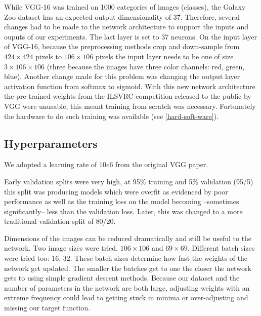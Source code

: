 
While VGG-16 was trained on 1000 categories of images (classes), the Galaxy Zoo dataset has an expected output dimensionality of 37. Therefore, several changes had to be made to the network architecture to support the inputs and ouputs of our experiments. The last layer is set to 37 neurons. On the input layer of VGG-16, because the preprocessing methods crop and down-sample from $424 \times 424$ pixels to $106 \times 106$ pixels the input layer needs to be one of size $3 \times 106 \times 106$ (three because the images have three color channels: red, green, blue). Another change made for this problem was changing the output layer activation function from softmax to sigmoid. With this new network architecture the pre-trained weights from the ILSVRC competition released to the public by VGG were unusable, this meant training from scratch was necessary. Fortunately the hardware to do such training was available (see \ref{hard-soft-ware}).

\subsection{Hyperparameters}

We adopted a learning rate of $10e6$ from the original VGG paper.

Early validation splits were very high, at 95\% training and 5\% validation (95/5) this split was producing models which were overfit as evidenced by poor performance as well as the training loss on the model becoming --sometimes significantly-- less than the validation loss. Later, this was changed to a more traditional validation split of 80/20.

Dimensions of the images can be reduced dramatically and still be useful to the network. Two image sizes were tried, $106 \times 106$ and $69 \times 69$. Different batch sizes were tried too: 16, 32. These batch sizes determine how fast the weights of the network get updated. The smaller the batches get to one the closer the network gets to using simple gradient descent methods. Because our dataset and the number of parameters in the network are both large, adjusting weights with an extreme frequency could lead to getting stuck in minima or over-adjusting and missing our target function.

